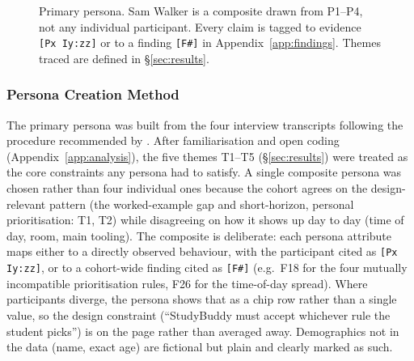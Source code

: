 \documentclass[a4paper,11pt]{article}
\begin{document}
\begin{figure}[p]
{%
}
\caption{Primary persona. Sam Walker is a composite drawn from P1--P4,
not any individual participant. Every claim is tagged to evidence
\texttt{[Px Iy:zz]} or to a finding \texttt{[F\#]} in
Appendix~\ref{app:findings}. Themes traced are defined in
\S\ref{sec:results}.}\label{fig:persona}
\end{figure}

\subsubsection{Persona Creation Method}\label{sec:persona-method}

The primary persona was built from the four interview transcripts
following the procedure recommended by \textcite{cooper2014}. After
familiarisation and open coding (Appendix~\ref{app:analysis}), the
five themes T1--T5 (\S\ref{sec:results}) were treated as the core
constraints any persona had to satisfy. A single composite persona
was chosen rather than four individual ones because the cohort
agrees on the design-relevant pattern (the worked-example gap and
short-horizon, personal prioritisation: T1, T2) while disagreeing
on how it shows up day to day (time of day, room, main tooling).
The composite is deliberate: each persona attribute maps either
to a directly observed behaviour, with the participant cited as
\texttt{[Px Iy:zz]}, or to a cohort-wide finding cited as
\texttt{[F\#]} (e.g.\ F18 for the four mutually incompatible
prioritisation rules, F26 for the time-of-day spread). Where
participants diverge, the persona shows that as a chip row rather
than a single value, so the design constraint (``StudyBuddy must
accept whichever rule the student picks'') is on the page rather
than averaged away. Demographics not in the data (name, exact age)
are fictional but plain and clearly marked as such.
\end{document}
